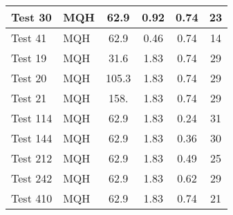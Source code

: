 \begin{table}[!ht]
\begin{center}
\begin{tabular}{|l|l|c|c|c|c|}
Test 30    &  MQH               &  62.9           &  0.92            &  0.74            &  23                    \\ \hline
Test 41    &  MQH               &  62.9           &  0.46            &  0.74            &  14                    \\ \hline
Test 19    &  MQH               &  31.6           &  1.83            &  0.74            &  29                    \\ \hline
Test 20    &  MQH               &  105.3          &  1.83            &  0.74            &  29                    \\ \hline
Test 21    &  MQH               &  158.           &  1.83            &  0.74            &  29                    \\ \hline
Test 114   &  MQH               &  62.9           &  1.83            &  0.24            &  31                    \\ \hline
Test 144   &  MQH               &  62.9           &  1.83            &  0.36            &  30                    \\ \hline
Test 212   &  MQH               &  62.9           &  1.83            &  0.49            &  25                    \\ \hline
Test 242   &  MQH               &  62.9           &  1.83            &  0.62            &  29                    \\ \hline
Test 410   &  MQH               &  62.9           &  1.83            &  0.74            &  21                    \\ \hline
\end{tabular}
\end{center}
\end{table}

